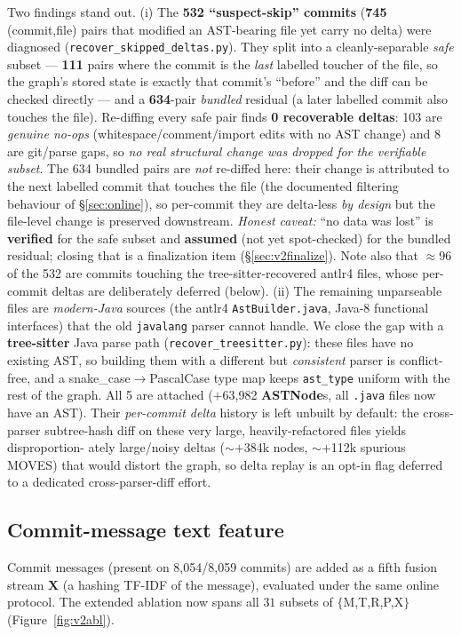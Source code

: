 \documentclass[11pt,a4paper]{article}
\newcommand{\code}[1]{\texttt{#1}}
\newcommand{\node}[1]{\textcolor{kgblue}{\textbf{#1}}}
\newcommand{\edge}[1]{\textsc{#1}}
\begin{document}
	Two findings stand out. (i) The \textbf{532 ``suspect-skip'' commits}
	(\textbf{745} (commit,file) pairs that modified an AST-bearing file yet carry no
	delta) were diagnosed (\texttt{recover\_skipped\_deltas.py}). They split into a
	cleanly-separable \emph{safe} subset --- \textbf{111} pairs where the commit is
	the \emph{last} labelled toucher of the file, so the graph's stored state is
	exactly that commit's ``before'' and the diff can be checked directly --- and a
	\textbf{634}-pair \emph{bundled} residual (a later labelled commit also touches
	the file). Re-diffing every safe pair finds \textbf{0 recoverable deltas}: 103
	are \emph{genuine no-ops} (whitespace/comment/import edits with no AST change)
	and 8 are git/parse gaps, so \emph{no real structural change was dropped for the
	verifiable subset}. The 634 bundled pairs are \emph{not} re-diffed here: their
	change is attributed to the next labelled commit that touches the file (the
	documented filtering behaviour of \S\ref{sec:online}), so per-commit they are
	delta-less \emph{by design} but the file-level change is preserved downstream.
	\emph{Honest caveat:} ``no data was lost'' is \textbf{verified} for the safe
	subset and \textbf{assumed} (not yet spot-checked) for the bundled residual;
	closing that is a finalization item (\S\ref{sec:v2finalize}). Note also that
	$\approx$96 of the 532 are commits touching the tree-sitter-recovered antlr4
	files, whose per-commit deltas are deliberately deferred (below).
	(ii) The remaining unparseable files are
	\emph{modern-Java} sources (the antlr4 \texttt{AstBuilder.java}, Java-8 functional
	interfaces) that the old \texttt{javalang} parser cannot handle. We close the gap
	with a \textbf{tree-sitter} Java parse path (\texttt{recover\_treesitter.py}):
	these files have no existing AST, so building them with a different but
	\emph{consistent} parser is conflict-free, and a snake\_case$\rightarrow$PascalCase
	type map keeps \code{ast\_type} uniform with the rest of the graph. All 5 are
	attached ($+$63{,}982 \node{ASTNode}s, all \texttt{.java} files now have an AST).
	Their \emph{per-commit delta} history is left unbuilt by default: the cross-parser
	subtree-hash diff on these very large, heavily-refactored files yields disproportion-
	ately large/noisy deltas ($\sim$$+$384k nodes, $\sim$$+$112k spurious \edge{MOVES})
	that would distort the graph, so delta replay is an opt-in flag deferred to a
	dedicated cross-parser-diff effort.
	
	\subsection{Commit-message text feature}
	Commit messages (present on 8{,}054/8{,}059 commits) are added as a fifth fusion
	stream \textbf{X} (a hashing TF-IDF of the message), evaluated under the same
	online protocol. The extended ablation now spans all $31$ subsets of
	$\{$M,T,R,P,X$\}$ (Figure~\ref{fig:v2abl}).
	
\end{document}
